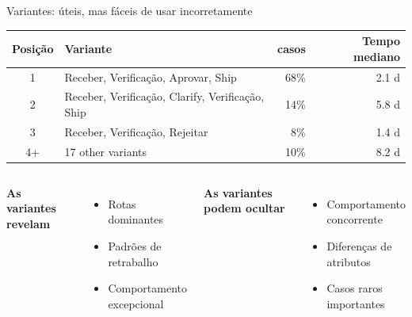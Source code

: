 \documentclass[aspectratio=169,11pt]{beamer}
\begin{document}
\begin{frame}{Variantes: úteis, mas fáceis de usar incorretamente}
  \small
  \begin{tabular}{@{}clrr@{}}
    \toprule
    Posição & Variante & casos & Tempo mediano\\
    \midrule
    1 & Receber, Verificação, Aprovar, Ship & 68\% & 2.1 d\\
    2 & Receber, Verificação, Clarify, Verificação, Ship & 14\% & 5.8 d\\
    3 & Receber, Verificação, Rejeitar & 8\% & 1.4 d\\
    4+ & 17 other variants & 10\% & 8.2 d\\
    \bottomrule
  \end{tabular}
  \vspace{0.45cm}
  \begin{columns}[T,onlytextwidth]
      \textbf{As variantes revelam}
      \begin{itemize}
        \item Rotas dominantes
        \item Padrões de retrabalho
        \item Comportamento excepcional
      \end{itemize}
      \textbf{As variantes podem ocultar}
      \begin{itemize}
        \item Comportamento concorrente
        \item Diferenças de atributos
        \item Casos raros importantes
      \end{itemize}
  \end{columns}
\end{frame}
\end{document}
